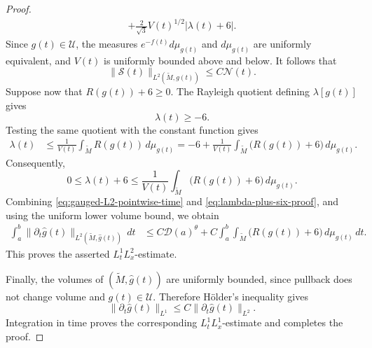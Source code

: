 \documentclass{amsart}
\begin{document}
\begin{proof}
\begin{align}
        +
        \frac{2}{\sqrt3}
        V(t)^{1/2}|\lambda(t)+6|.
\label{eq:gauged-L2-pointwise-time}
\end{align}
Since \(g(t)\in\mathcal U\), the measures
\(e^{-f(t)}d\mu_{g(t)}\) and \(d\mu_{g(t)}\) are uniformly equivalent,
and \(V(t)\) is uniformly bounded above and below. It follows that
\[
        \|\mathcal S(t)\|_{L^2(\widetilde M,g(t))}
        \leq
        C\mathcal N(t).
\]
Suppose now that \(R(g(t))+6\geq0\). The Rayleigh quotient defining
\(\lambda[g(t)]\) gives
\[
        \lambda(t)\geq-6.
\]
Testing the same quotient with the constant function gives
\[
\begin{aligned}
        \lambda(t)
        &\leq
        \frac{1}{V(t)}
        \int_{\widetilde M}R(g(t))\,d\mu_{g(t)}=
        -6+
        \frac{1}{V(t)}
        \int_{\widetilde M}
        \bigl(R(g(t))+6\bigr)\,d\mu_{g(t)}.
\end{aligned}
\]
Consequently,
\begin{equation}
\label{eq:lambda-plus-six-proof}
        0\leq\lambda(t)+6
        \leq
        \frac{1}{V(t)}
        \int_{\widetilde M}
        \bigl(R(g(t))+6\bigr)\,d\mu_{g(t)}.
\end{equation}
Combining \eqref{eq:gauged-L2-pointwise-time} and
\eqref{eq:lambda-plus-six-proof}, and using the uniform lower volume
bound, we obtain
\begin{align}
        \int_a^b
        \|\partial_t\widehat g(t)\|
        _{L^2(\widetilde M,\widehat g(t))}
        \,dt
        &\leq
        C\mathcal D(a)^\theta
        +
        C\int_a^b
        \int_{\widetilde M}
        \bigl(R(g(t))+6\bigr)
        \,d\mu_{g(t)}\,dt.
\end{align}
This proves the asserted \(L_t^1L_x^2\)-estimate.

\noindent Finally, the volumes of
\((\widetilde M,\widehat g(t))\) are uniformly bounded, since pullback
does not change volume and \(g(t)\in\mathcal U\). Therefore Hölder's
inequality gives
\[
        \|\partial_t\widehat g(t)\|_{L^1}
        \leq
        C
        \|\partial_t\widehat g(t)\|_{L^2}.
\]
Integration in time proves the corresponding
\(L_t^1L_x^1\)-estimate and completes the proof.
\end{proof}
\end{document}
